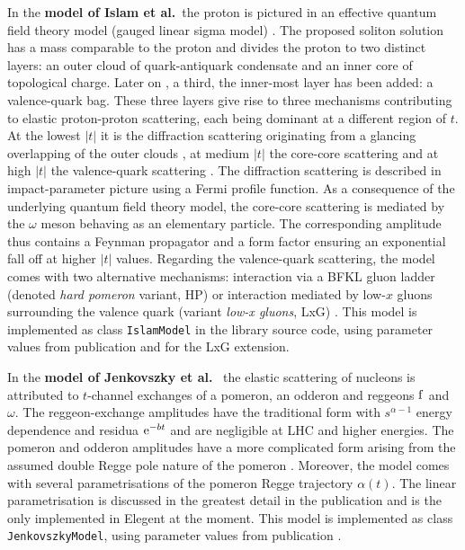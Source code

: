 \documentclass[preprint,12pt]{elsarticle}
\def\class#1{{\tt #1}}
\def\e{{\rm e}}
\begin{document}
In the {\bf model of Islam et al.}~the proton is pictured in an effective quantum field theory model (gauged linear sigma model) \cite{islam06}. The proposed soliton solution has a mass comparable to the proton and divides the proton to two distinct layers: an outer cloud of quark-antiquark condensate and an inner core of topological charge. Later on \cite{islam05}, a third, the inner-most layer has been added: a valence-quark bag. These three layers give rise to three mechanisms contributing to elastic proton-proton scattering, each being dominant at a different region of $t$. At the lowest $|t|$ it is the diffraction scattering originating from a glancing overlapping of the outer clouds \cite{islam84,islam87}, at medium $|t|$ the core-core scattering \cite{islam06} and at high $|t|$ the valence-quark scattering \cite{islam05,islam09}. The diffraction scattering is described in impact-parameter picture using a Fermi profile function. As a consequence of the underlying quantum field theory model, the core-core scattering is mediated by the $\omega$ meson behaving as an elementary particle. The corresponding amplitude thus contains a Feynman propagator and a form factor ensuring an exponential fall off at higher $|t|$ values. Regarding the valence-quark scattering, the model comes with two alternative mechanisms: interaction via a BFKL gluon ladder (denoted {\em hard pomeron} variant, HP) \cite{islam05} or interaction mediated by low-$x$ gluons surrounding the valence quark (variant {\em low-x gluons}, LxG) \cite{islam09}. This model is implemented as class \class{IslamModel} in the library source code, using parameter values from publication \cite{islam06} and \cite{islam09} for the LxG extension.

In the {\bf model of Jenkovszky et al.}~\cite{jenkovszky11} the elastic scattering of nucleons is attributed to $t$-channel exchanges of a pomeron, an odderon and reggeons $\rm f$ and $\omega$. The reggeon-exchange amplitudes have the traditional form with $s^{\alpha - 1}$ energy dependence and residua $\e^{-bt}$ and are negligible at LHC and higher energies. The pomeron and odderon amplitudes have a more complicated form arising from the assumed double Regge pole nature of the pomeron \cite[section 2]{jenkovszky86}. Moreover, the model comes with several parametrisations of the pomeron Regge trajectory $\alpha(t)$. The linear parametrisation is discussed in the greatest detail in the publication and is the only implemented in Elegent at the moment. This model is implemented as class \class{JenkovszkyModel}, using parameter values from publication \cite{jenkovszky11}.
\end{document}
